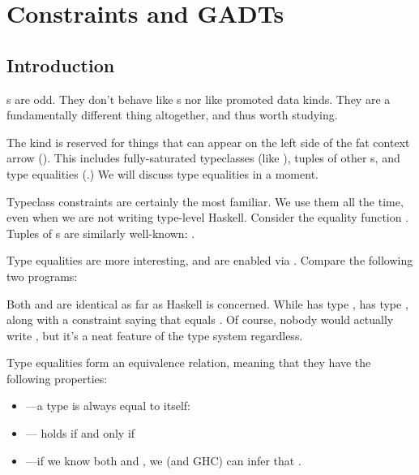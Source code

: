 \documentclass[book.tex]{subfiles}
\begin{document}
\chapter{Constraints and GADTs}
\label{constraints}

\section{Introduction}

s are odd. They don't behave like s nor like
promoted data kinds. They are a fundamentally different thing altogether, and
thus worth studying.

The  kind is reserved for things that can appear on the left
side of the fat context arrow (\hs{=>}). This includes fully-saturated
typeclasses (like ), tuples of other s, and type
equalities (.) We will discuss type equalities in a moment.

Typeclass constraints are certainly the most familiar. We use them all the time,
even when we are not writing type-level Haskell. Consider the equality function
. Tuples of s are similarly
well-known: .

Type equalities are more interesting, and are enabled via . Compare
the following two programs:


Both  and  are identical as far as Haskell is concerned.
While  has type ,  has type , along with a
constraint saying that  equals . Of course, nobody would actually
write , but it's a neat feature of the type system regardless.

Type equalities form an equivalence relation, meaning that they have the
following properties:

\begin{itemize}
  \item{---a type is always equal to itself: }
  \item{--- holds if and only if }
  \item{---if we know both  and , we (and GHC) can infer that .}
\end{itemize}
\end{document}
